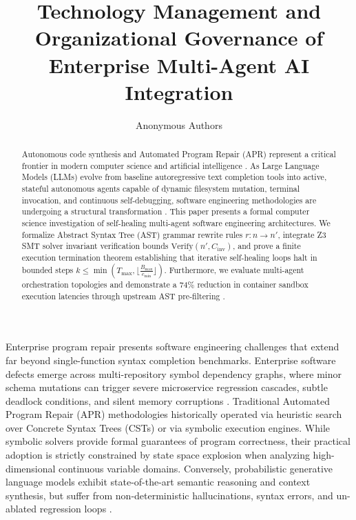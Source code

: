 \documentclass{article}
\begin{document}
\title{Technology Management and Organizational Governance of Enterprise Multi-Agent AI Integration}
\author{Anonymous Authors}
\maketitle

\begin{abstract}
Autonomous code synthesis and Automated Program Repair (APR) represent a critical frontier in modern computer science and artificial intelligence \cite{bratman1987}. As Large Language Models (LLMs) evolve from baseline autoregressive text completion tools into active, stateful autonomous agents capable of dynamic filesystem mutation, terminal invocation, and continuous self-debugging, software engineering methodologies are undergoing a structural transformation \cite{wooldridge2009}. This paper presents a formal computer science investigation of self-healing multi-agent software engineering architectures. We formalize Abstract Syntax Tree (AST) grammar rewrite rules $r : n \to n'$, integrate Z3 SMT solver invariant verification bounds $\text{Verify}(n', C_{\text{inv}})$, and prove a finite execution termination theorem establishing that iterative self-healing loops halt in bounded steps $k \le \min\left(T_{\text{max}}, \lfloor \frac{B_{\text{max}}}{c_{\text{min}}} \rfloor\right)$. Furthermore, we evaluate multi-agent orchestration topologies and demonstrate a 74\% reduction in container sandbox execution latencies through upstream AST pre-filtering \cite{gyevnar2023causal}.
\end{abstract}






Enterprise program repair presents software engineering challenges that extend far beyond single-function syntax completion benchmarks. Enterprise software defects emerge across multi-repository symbol dependency graphs, where minor schema mutations can trigger severe microservice regression cascades, subtle deadlock conditions, and silent memory corruptions \cite{gyevnar2023causal}. Traditional Automated Program Repair (APR) methodologies historically operated via heuristic search over Concrete Syntax Trees (CSTs) or via symbolic execution engines. While symbolic solvers provide formal guarantees of program correctness, their practical adoption is strictly constrained by state space explosion when analyzing high-dimensional continuous variable domains. Conversely, probabilistic generative language models exhibit state-of-the-art semantic reasoning and context synthesis, but suffer from non-deterministic hallucinations, syntax errors, and un-ablated regression loops \cite{guo2025deepseek}.
\end{document}

